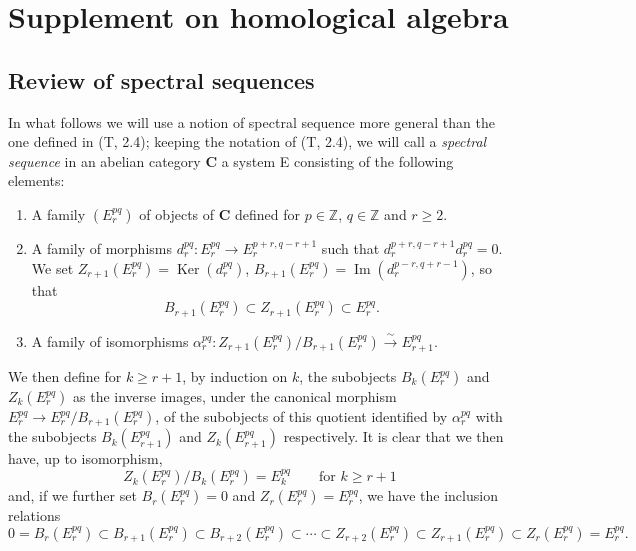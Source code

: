 \section{Supplement on homological algebra}
\label{section:0.11}

\subsection{Review of spectral sequences}
\label{subsection:0.11.1}

\begin{env}[11.1.1]
\label{0.11.1.1}
In what follows we will use a notion of spectral sequence more general than
the one defined in (T, 2.4); keeping the notation of (T, 2.4), we will
call a \emph{spectral sequence} in an abelian category $\boldsymbol{C}$ a
system E consisting of the following elements:
\begin{enumerate}
  \item[$a)$] A family $(E_r^{pq})$ of objects of $\boldsymbol{C}$ defined for
    $p\in\mathbb Z$, $q\in\mathbb Z$ and $r\geq2$.
  \item[$b)$] A family of morphisms
    $d_r^{pq}:E_r^{pq}\to E_r^{p+r,q-r+1}$ such that
    $d_r^{p+r,q-r+1}d_r^{pq}=0$. We set
    $Z_{r+1}(E_r^{pq})=\operatorname{Ker}(d_r^{pq})$,
    $B_{r+1}(E_r^{pq})=\operatorname{Im}(d_r^{p-r,q+r-1})$, so that
    \[
      B_{r+1}(E_r^{pq})\subset Z_{r+1}(E_r^{pq})\subset E_r^{pq}.
    \]
  \item[$c)$] A family of isomorphisms
    $\alpha_r^{pq}:Z_{r+1}(E_r^{pq})/B_{r+1}(E_r^{pq})
    \xrightarrow{\sim}E_{r+1}^{pq}$.
\end{enumerate}

We then define for $k\geq r+1$, by induction on $k$, the subobjects
$B_k(E_r^{pq})$ and $Z_k(E_r^{pq})$ as the inverse images, under the
canonical morphism $E_r^{pq}\to E_r^{pq}/B_{r+1}(E_r^{pq})$, of the subobjects of
this quotient identified by $\alpha_r^{pq}$ with the subobjects $B_k(E_{r+1}^{pq})$ and
$Z_k(E_{r+1}^{pq})$ respectively. It is clear that we then have, up to
isomorphism,
\[
\label{0.11.1.1.1}
  Z_k(E_r^{pq})/B_k(E_r^{pq})=E_k^{pq}
  \qquad\text{for }k\geq r+1
  \tag{11.1.1.1}
\]
and, if we further set $B_r(E_r^{pq})=0$ and $Z_r(E_r^{pq})=E_r^{pq}$, we have
the inclusion relations
\[
\label{0.11.1.1.2}
  0=B_r(E_r^{pq})\subset B_{r+1}(E_r^{pq})\subset B_{r+2}(E_r^{pq})
  \subset\cdots\subset Z_{r+2}(E_r^{pq})\subset Z_{r+1}(E_r^{pq})
  \subset Z_r(E_r^{pq})=E_r^{pq}.
  \tag{11.1.1.2}
\]


\end{env}
